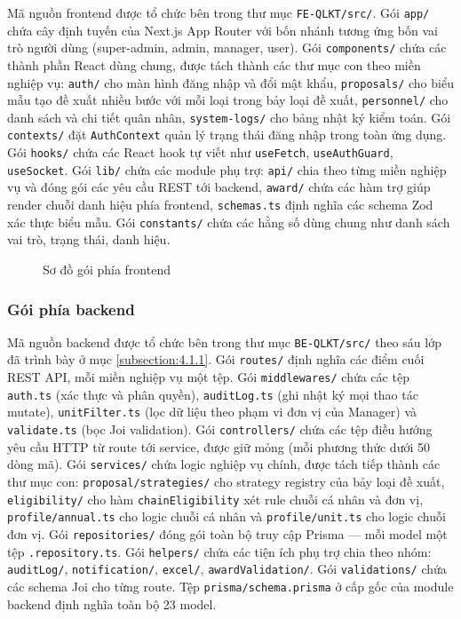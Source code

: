 \documentclass[../DoAn.tex]{subfiles}
\begin{document}
Mã nguồn frontend được tổ chức bên trong thư mục \texttt{FE-QLKT/src/}. Gói \texttt{app/} chứa cây định tuyến của Next.js App Router với bốn nhánh tương ứng bốn vai trò người dùng (super-admin, admin, manager, user). Gói \texttt{components/} chứa các thành phần React dùng chung, được tách thành các thư mục con theo miền nghiệp vụ: \texttt{auth/} cho màn hình đăng nhập và đổi mật khẩu, \texttt{proposals/} cho biểu mẫu tạo đề xuất nhiều bước với mỗi loại trong bảy loại đề xuất, \texttt{personnel/} cho danh sách và chi tiết quân nhân, \texttt{system-logs/} cho bảng nhật ký kiểm toán. Gói \texttt{contexts/} đặt \texttt{AuthContext} quản lý trạng thái đăng nhập trong toàn ứng dụng. Gói \texttt{hooks/} chứa các React hook tự viết như \texttt{useFetch}, \texttt{useAuthGuard}, \texttt{useSocket}. Gói \texttt{lib/} chứa các module phụ trợ: \texttt{api/} chia theo từng miền nghiệp vụ và đóng gói các yêu cầu REST tới backend, \texttt{award/} chứa các hàm trợ giúp render chuỗi danh hiệu phía frontend, \texttt{schemas.ts} định nghĩa các schema Zod xác thực biểu mẫu. Gói \texttt{constants/} chứa các hằng số dùng chung như danh sách vai trò, trạng thái, danh hiệu.

\begin{figure}[H]
    \centering
    \caption{Sơ đồ gói phía frontend}
    \label{fig:goi-frontend}
\end{figure}

\subsubsection{Gói phía backend}

Mã nguồn backend được tổ chức bên trong thư mục \texttt{BE-QLKT/src/} theo sáu lớp đã trình bày ở mục \ref{subsection:4.1.1}. Gói \texttt{routes/} định nghĩa các điểm cuối REST API, mỗi miền nghiệp vụ một tệp. Gói \texttt{middlewares/} chứa các tệp \texttt{auth.ts} (xác thực và phân quyền), \texttt{auditLog.ts} (ghi nhật ký mọi thao tác mutate), \texttt{unitFilter.ts} (lọc dữ liệu theo phạm vi đơn vị của Manager) và \texttt{validate.ts} (bọc Joi validation). Gói \texttt{controllers/} chứa các tệp điều hướng yêu cầu HTTP từ route tới service, được giữ mỏng (mỗi phương thức dưới 50 dòng mã). Gói \texttt{services/} chứa logic nghiệp vụ chính, được tách tiếp thành các thư mục con: \texttt{proposal/strategies/} cho strategy registry của bảy loại đề xuất, \texttt{eligibility/} cho hàm \texttt{chainEligibility} xét rule chuỗi cá nhân và đơn vị, \texttt{profile/annual.ts} cho logic chuỗi cá nhân và \texttt{profile/unit.ts} cho logic chuỗi đơn vị. Gói \texttt{repositories/} đóng gói toàn bộ truy cập Prisma --- mỗi model một tệp \texttt{.repository.ts}. Gói \texttt{helpers/} chứa các tiện ích phụ trợ chia theo nhóm: \texttt{auditLog/}, \texttt{notification/}, \texttt{excel/}, \texttt{awardValidation/}. Gói \texttt{validations/} chứa các schema Joi cho từng route. Tệp \texttt{prisma/schema.prisma} ở cấp gốc của module backend định nghĩa toàn bộ 23 model.
\end{document}
